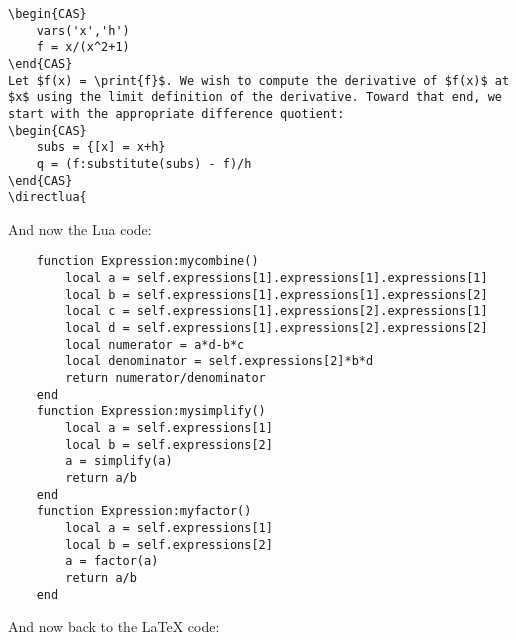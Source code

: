 \documentclass{article}
\begin{document}
\begin{codebox}
\begin{verbatim}
\begin{CAS}
    vars('x','h')
    f = x/(x^2+1)
\end{CAS}
Let $f(x) = \print{f}$. We wish to compute the derivative of $f(x)$ at $x$ using the limit definition of the derivative. Toward that end, we start with the appropriate difference quotient:
\begin{CAS}
    subs = {[x] = x+h}
    q = (f:substitute(subs) - f)/h
\end{CAS}
\directlua{
\end{verbatim}
\end{codebox}
And now the Lua code:
\begin{codebox}
\begin{verbatim}
    function Expression:mycombine()
        local a = self.expressions[1].expressions[1].expressions[1]
        local b = self.expressions[1].expressions[1].expressions[2]
        local c = self.expressions[1].expressions[2].expressions[1]
        local d = self.expressions[1].expressions[2].expressions[2]
        local numerator = a*d-b*c
        local denominator = self.expressions[2]*b*d
        return numerator/denominator
    end
    function Expression:mysimplify()
        local a = self.expressions[1]
        local b = self.expressions[2]
        a = simplify(a)
        return a/b 
    end
    function Expression:myfactor()
        local a = self.expressions[1]
        local b = self.expressions[2]
        a = factor(a)
        return a/b
    end
\end{verbatim}
\end{codebox}
And now back to the \LaTeX{} code:
\end{document}
